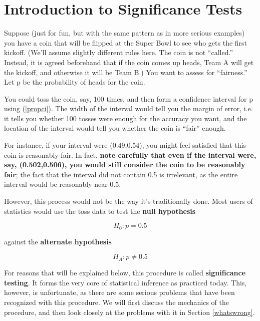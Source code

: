 \chapter{Introduction to Significance Tests} 
\label{chap:sigtests} 

Suppose (just for fun, but with the same pattern as in more serious
examples) you have a coin that will be flipped at the Super Bowl to see
who gets the first kickoff.  (We'll assume slightly different rules
here.  The coin is not ``called.''  Instead, it is agreed beforehand
that if the coin comes up heads, Team A will get the kickoff, and
otherwise it will be Team B.) You want to assess for ``fairness.''  Let
p be the probability of heads for the coin.  

You could toss the coin, say, 100 times, and then form a confidence
interval for p using (\ref{propci}).  The width of the interval would
tell you the margin of error, i.e. it tells you whether 100 tosses were
enough for the accuracy you want, and the location of the interval would
tell you whether the coin is ``fair'' enough.

For instance, if your interval were (0.49,0.54), you might feel
satisfied that this coin is reasonably fair.  In fact, {\bf note
carefully that even if the interval were, say, (0.502,0.506), you would
still consider the coin to be reasonably fair}; the fact that the
interval did not contain 0.5 is irrelevant, as the entire interval would
be reasonably near 0.5.

However, this process would not be the way it's traditionally done.
Most users of statistics would use the toss data to test the {\bf null
hypothesis} 

\begin{equation}
H_0:  p = 0.5
\end{equation}

against the {\bf alternate hypothesis} 

\begin{equation}
H_A:  p \neq 0.5
\end{equation}

For reasons that will be explained below, this procedure is called {\bf
significance testing}.  It forms the very core of statistical inference
as practiced today.  This, however, is unfortunate, as there are some
serious problems that have been recognized with this procedure.  We will
first discuss the mechanics of the procedure, and then look closely at
the problems with it in Section \ref{whatswrong}.

